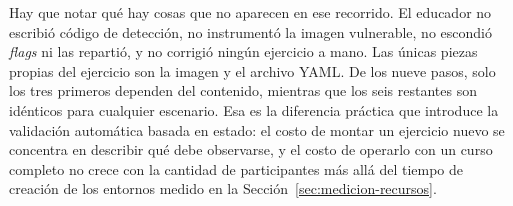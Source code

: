 Hay que notar qué hay cosas que no aparecen en ese recorrido. El educador no escribió código
de detección, no instrumentó la imagen vulnerable, no escondió \textit{flags} ni
las repartió, y no corrigió ningún ejercicio a mano. Las únicas piezas propias
del ejercicio son la imagen y el archivo YAML. De los nueve pasos, solo los tres
primeros dependen del contenido, mientras que los seis restantes son idénticos
para cualquier escenario. Esa es la diferencia práctica que introduce la
validación automática basada en estado: el costo de montar un ejercicio nuevo se
concentra en describir qué debe observarse, y el costo de operarlo con un curso
completo no crece con la cantidad de participantes más allá del tiempo de
creación de los entornos medido en la Sección~\ref{sec:medicion-recursos}.
